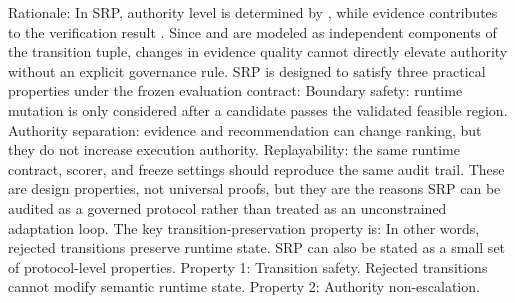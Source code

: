 {}Rationale: In SRP, authority level is determined by , while evidence contributes to the verification result . Since  and  are modeled as independent components of the transition tuple, changes in evidence quality cannot directly elevate authority without an explicit governance rule.\markdownRendererInterblockSeparator
{}
\markdownRendererSectionEnd \markdownRendererSectionBegin
{}\markdownRendererInterblockSeparator
{}SRP is designed to satisfy three practical properties under the frozen evaluation contract:\markdownRendererInterblockSeparator
{}\markdownRendererUlBeginTight
\markdownRendererUlItem Boundary safety: runtime mutation is only considered after a candidate passes the validated feasible region.\markdownRendererUlItemEnd 
\markdownRendererUlItem Authority separation: evidence and recommendation can change ranking, but they do not increase execution authority.\markdownRendererUlItemEnd 
\markdownRendererUlItem Replayability: the same runtime contract, scorer, and freeze settings should reproduce the same audit trail.\markdownRendererUlItemEnd 
\markdownRendererUlEndTight \markdownRendererInterblockSeparator
{}These are design properties, not universal proofs, but they are the reasons SRP can be audited as a governed protocol rather than treated as an unconstrained adaptation loop.\markdownRendererParagraphSeparator
{}The key transition-preservation property is:\markdownRendererInterblockSeparator
{}\markdownRendererInterblockSeparator
{}In other words, rejected transitions preserve runtime state.\markdownRendererInterblockSeparator
{}
\markdownRendererSectionEnd \markdownRendererSectionBegin
{}\markdownRendererInterblockSeparator
{}SRP can also be stated as a small set of protocol-level properties.\markdownRendererParagraphSeparator
{}Property 1: Transition safety.\markdownRendererInterblockSeparator
{}\markdownRendererInterblockSeparator
{}Rejected transitions cannot modify semantic runtime state.\markdownRendererParagraphSeparator
{}Property 2: Authority non-escalation.\markdownRendererInterblockSeparator
{}\markdownRendererInterblockSeparator
